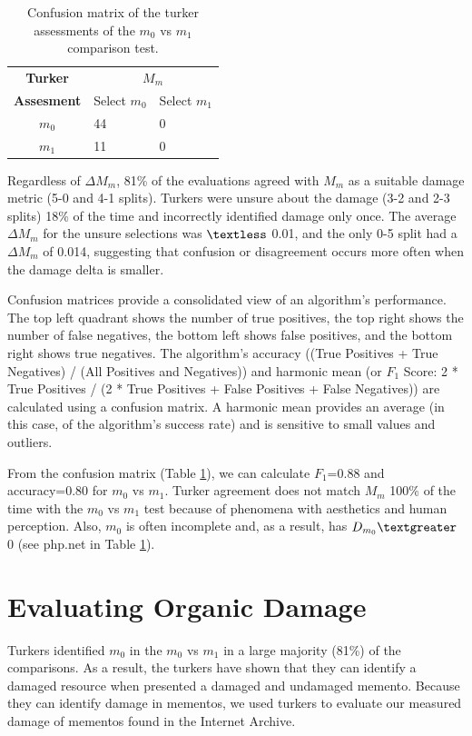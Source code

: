 \begin{table}
\centering\begin{tabular}{cll}
\textbf{Turker} & \multicolumn{2}{c}{ \textbf{ $M_{m}$}}                           \\
\textbf{Assesment}                  &          Select $m_{0}$             &           Select $m_{1}$             \\ \cline{2-3} 
       $m_{0}$           & \multicolumn{1}{|l}{44} & \multicolumn{1}{|l|}{0} \\ \cline{2-3} 
       $m_{1}$           & \multicolumn{1}{|l}{11} & \multicolumn{1}{|l|}{0} \\ \cline{2-3} 
\end{tabular}
 \caption{Confusion matrix of the turker assessments of the $m_0$ vs $m_1$ comparison test.}
  \label{m0cm}
\end{table}


Regardless of {$\Delta M_m$}, 81\% of the evaluations agreed with $M_m$ as a suitable damage metric (5-0 and 4-1 splits). Turkers were unsure about the damage (3-2 and 2-3 splits) 18\% of the time and incorrectly identified damage only once. The average {$\Delta M_m$} for the unsure selections was $\textless$ 0.01, and the only 0-5 split had a {$\Delta M_m$} of 0.014, suggesting that confusion or disagreement occurs more often when the damage delta is smaller. 

Confusion matrices provide a consolidated view of an algorithm's performance. The top left quadrant shows the number of true positives, the top right shows the number of false negatives, the bottom left shows false positives, and the bottom right shows true negatives. The algorithm's accuracy ((True Positives + True Negatives) / (All Positives and Negatives)) and harmonic mean (or $F_1$ Score: 2 * True Positives / (2 * True Positives + False Positives + False Negatives)) are calculated using a confusion  matrix. A harmonic mean provides an average (in this case, of the algorithm's success rate) and is sensitive to small values and outliers.  

From the confusion matrix (Table \ref{m0cm}), we can calculate $F_1$=0.88 and accuracy=0.80 for $m_0$ vs $m_1$. Turker agreement does not match $M_m$ 100\% of the time with the $m_0$ vs $m_1$ test because of phenomena with aesthetics and human perception. Also, $m_0$ is often incomplete and, as a result, has $D_{m_0} \textgreater$ 0 (see php.net in Table \ref{m0cm}).

\section{Evaluating Organic Damage}
\label{turkActual}
Turkers identified $m_0$ in the $m_0$ vs $m_1$ in a large majority (81\%) of the comparisons. As a result, the turkers have shown that they can identify a damaged resource when presented a damaged and undamaged memento. Because they can identify damage in mementos, we used turkers to evaluate our measured damage of mementos found in the Internet Archive. 

